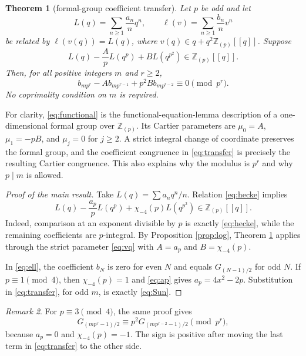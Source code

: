 \documentclass[11pt]{article}
\newtheorem{theorem}{Theorem}[section]
\theoremstyle{remark}
\newtheorem{remark}[theorem]{Remark}
\newcommand{\Z}{\mathbb Z}
\newcommand{\chiD}{\chi_{-4}}
\begin{document}
\begin{theorem}[formal-group coefficient transfer]\label{thm:transfer}
Let $p$ be odd and let
\[
L(q)=\sum_{n\ge1}\frac{a_n}{n}q^n,
\qquad
\ell(v)=\sum_{n\ge1}\frac{b_n}{n}v^n
\]
be related by $\ell(v(q))=L(q)$, where
$v(q)\in q+q^2\Z_{(p)}[[q]]$.  Suppose
\begin{equation}\label{eq:functional}
L(q)-\frac{A}{p}L(q^p)+B L(q^{p^2})
\in\Z_{(p)}[[q]].
\end{equation}
Then, for all positive integers $m$ and $r\ge2$,
\begin{equation}\label{eq:transfer}
b_{mp^r}-A b_{mp^{r-1}}+p^2B b_{mp^{r-2}}\equiv0\pmod {p^r}.
\end{equation}
No coprimality condition on $m$ is required.
\end{theorem}

For clarity, \eqref{eq:functional} is the functional-equation-lemma
description of a one-dimensional formal group over $\Z_{(p)}$.  Its
Cartier parameters are $\mu_0=A$, $\mu_1=-pB$, and
$\mu_j=0$ for $j\ge2$.  A strict integral change of coordinate preserves
the formal group, and the coefficient congruence in \eqref{eq:transfer}
is precisely the resulting Cartier congruence.  This also explains why the
modulus is $p^r$ and why $p\mid m$ is allowed.

\begin{proof}[Proof of the main result]
Take $L(q)=\sum a_nq^n/n$.  Relation \eqref{eq:hecke} implies
\begin{equation}\label{eq:integrality}
L(q)-\frac{a_p}{p}L(q^p)+\chiD(p)L(q^{p^2})
\in\Z_{(p)}[[q]].
\end{equation}
Indeed, comparison at an exponent divisible by $p$ is exactly
\eqref{eq:hecke}, while the remaining coefficients are $p$-integral.
By Proposition \ref{prop:log}, Theorem \ref{thm:transfer} applies through
the strict parameter \eqref{eq:vq} with $A=a_p$ and $B=\chiD(p)$.

In \eqref{eq:ell}, the coefficient $b_N$ is zero for even $N$ and equals
$G_{(N-1)/2}$ for odd $N$.  If $p\equiv1\pmod4$, then
$\chiD(p)=1$ and \eqref{eq:ap} gives $a_p=4x^2-2p$.  Substitution in
\eqref{eq:transfer}, for odd $m$, is exactly \eqref{eq:Sun}.
\end{proof}

\begin{remark}
For $p\equiv3\pmod4$, the same proof gives
\[
G_{(mp^r-1)/2}\equiv p^2G_{(mp^{r-2}-1)/2}\pmod {p^r},
\]
because $a_p=0$ and $\chiD(p)=-1$.  The sign is positive after moving the
last term in \eqref{eq:transfer} to the other side.
\end{remark}
\end{document}
